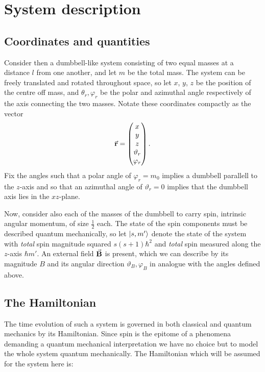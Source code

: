 \documentclass[a4paper]{article}
\begin{document}
\section{System description}
\subsection{Coordinates and quantities}
Consider then a dumbbell-like system consisting of two equal masses at a distance \(l\) from one
another, and let \(m\) be the total mass. The system can be freely translated and rotated
throughout space, so let \(x\), \(y\), \(z\)  be the position
of the centre off mass, and \(\theta_r, \varphi_r\) be the polar and azimuthal angle
respectively of the axis connecting the two masses. Notate these coordinates compactly as the
vector \[
\va{r}
= \begin{pmatrix} x\\ y \\ z\\ \vartheta_r \\\varphi_r\end{pmatrix}
.\] 
Fix the angles such that a polar angle of \(\varphi_r = m_0\) implies a dumbbell parallell
to the \(z\)-axis and so that an azimuthal angle of \(\vartheta_r = 0\) implies that the dumbbell
axis lies in the \(xz\)-plane. 

Now, consider also each of the masses of the dumbbell to carry spin, intrinsic angular
momentum, of size \(\frac{1}{2}\) each. %
 The state of the spin components must be
described quantum mechanically, so let \(\ket{s, m'}\) denote the state of the system with
\textit{total} spin magnitude squared \(s(s+1)\hbar^2\) and \textit{total} spin measured
along the \(z\)-axis \(\hbar m'\). An external field \(\va{B}\) is present, which
we can describe by its magnitude \(B\) and its angular direction \(\vartheta_B, \varphi_B\)
in analogue with the angles defined above.

\subsection{The Hamiltonian}

The time evolution of such a system is governed in both classical and quantum mechanics by
its Hamiltonian. Since spin is the epitome of a phenomena demanding a quantum mechanical
interpretation we have no choice but to model the whole system quantum mechanically.%
The Hamiltonian which will be assumed for the system here is:
\end{document}
